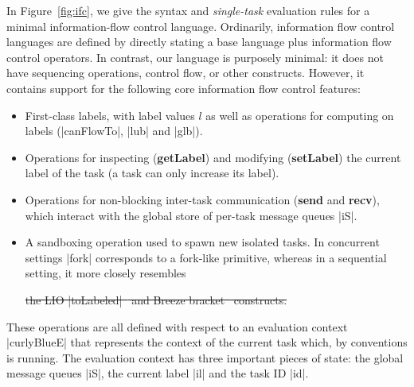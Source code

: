 In Figure~\ref{fig:ifc}, we give the syntax and \emph{single-task}
evaluation rules for a minimal information-flow control language.
Ordinarily, information flow control languages are defined by directly
stating a base language plus information flow control operators.  In
contrast, our language is purposely minimal: it does not have sequencing
operations, control flow, or other constructs.  However, it contains
support for the following core information flow control features:

\begin{itemize}
    \item First-class labels, with label values $l$ as well as operations for computing on
labels (|canFlowTo|, |lub| and |glb|).
    \item Operations for inspecting (\textbf{getLabel}) and modifying
    (\textbf{setLabel}) the current label of the task (a task can only increase its label).
    \item Operations for non-blocking inter-task communication (\textbf{send}
    and \textbf{recv}), which interact with the global store of per-task
    message queues |iS|.
    \item A sandboxing operation used to spawn new isolated tasks. In
    concurrent settings |fork| corresponds to a fork-like primitive,
    whereas in a
    sequential setting, it more closely resembles

    \sout{the LIO
    |toLabeled|~\cite{lio} and Breeze
    bracket~\cite{Hritcu:2013:YIB:2497621.2498098} constructs.}
\end{itemize}

These operations are all defined with respect to an evaluation context
|curlyBlueE| that represents the context of the current task which, by
conventions is running. The evaluation context has three important pieces of
state: the global message queues |iS|, the current label |il| and the task ID |id|.

